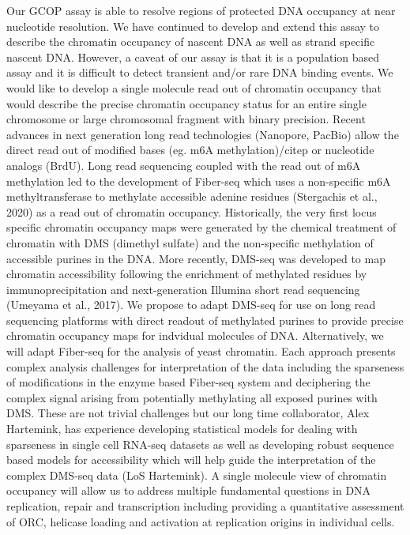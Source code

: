 Our GCOP assay is able to resolve regions of protected DNA occupancy at near nucleotide resolution.  We have continued to develop and extend this assay to describe the chromatin occupancy of nascent DNA as well as strand specific nascent DNA.  However, a caveat of our assay is that it is a population based assay and it is difficult to detect transient and/or rare DNA binding events.  We would like to develop a single molecule read out of chromatin occupancy that would describe the precise chromatin occupancy status for an entire single chromosome or large chromosomal fragment with binary precision.  Recent advances in next generation long read technologies (\eg Nanopore, PacBio) allow the direct read out of modified bases (eg. m6A methylation)/citep{} or nucleotide analogs (\eg BrdU)\citep{Muller2019-hd, Hennion2020-on}.  Long read sequencing coupled with the read out of m6A methylation led to the development of Fiber-seq which uses a non-specific m6A methyltransferase to methylate accessible adenine residues (Stergachis et al., 2020) as a read out of chromatin occupancy.  Historically, the very first locus specific chromatin occupancy maps were generated by the chemical treatment of chromatin with DMS (dimethyl sulfate) and the non-specific methylation of accessible purines in the DNA. More recently,  DMS-seq was developed to map chromatin accessibility following the enrichment of methylated residues by immunoprecipitation and next-generation Illumina short read sequencing (Umeyama et al., 2017).  We propose to adapt DMS-seq for use on long read sequencing platforms with direct readout of methylated purines to provide precise chromatin occupancy maps for indvidual molecules of DNA.   Alternatively, we will adapt Fiber-seq for the analysis of yeast chromatin.  Each approach presents complex analysis challenges for interpretation of the data including the sparseness of modifications in the enzyme based Fiber-seq system and deciphering the complex signal arising from potentially methylating all exposed purines with DMS.  These are not trivial challenges but our long time collaborator, Alex Hartemink, has experience developing statistical models for dealing with sparseness in single cell RNA-seq datasets\citep{} as well as developing robust sequence based models for accessibility which will help guide the interpretation of the complex DMS-seq data (LoS Hartemink).  A single molecule view of chromatin occupancy will allow us to address multiple fundamental questions in DNA replication, repair and transcription including providing a quantitative assessment of ORC, helicase loading and activation at replication origins in individual cells.

 


